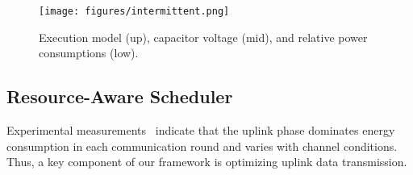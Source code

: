 \begin{figure}[tp]
    \centering
    \texttt{[image: figures/intermittent.png]}
    \vspace{-1.0cm}
    \caption{Execution model (up), capacitor voltage (mid), and relative power consumptions (low).  }
    \label{fig:intermittent}
\end{figure}

\subsection{Resource-Aware Scheduler}
\label{sec:resource-aware-cloud-assistance}
 Experimental measurements~\cite{mileiko2023run} indicate that the uplink phase dominates energy consumption in each communication round and varies with channel conditions. Thus, a key component of our framework is optimizing uplink data transmission. 

\noindent
